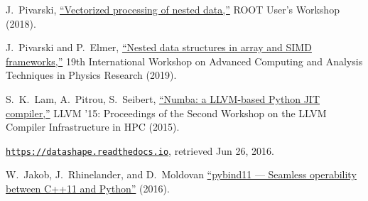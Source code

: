 \documentclass{webofc}
\begin{document}
\begin{thebibliography}{}
J.\ Pivarski, \href{https://indico.cern.ch/event/697389/contributions/3102772/}{``Vectorized processing of nested data,''} ROOT User's Workshop (2018).

J.\ Pivarski and P.\ Elmer, \href{https://indico.cern.ch/event/708041/contributions/3276200/}{``Nested data structures in array and SIMD frameworks,''} 19th International Workshop on Advanced Computing and Analysis Techniques in Physics Research (2019).

S.\ K.\ Lam, A.\ Pitrou, S.\ Seibert, \href{https://doi.org/10.1145/2833157.2833162}{``Numba: a LLVM-based Python JIT compiler,''} LLVM '15: Proceedings of the Second Workshop on the LLVM Compiler Infrastructure in HPC (2015).

\href{https://web.archive.org/web/20160626181703/https://datashape.readthedocs.io/en/latest/}{\tt https://datashape.readthedocs.io}, retrieved Jun 26, 2016.

W.\ Jakob, J.\ Rhinelander, and D.\ Moldovan \href{https://github.com/pybind/pybind11}{``pybind11 --- Seamless operability between C++11 and Python''} (2016).

\end{thebibliography}
\end{document}
